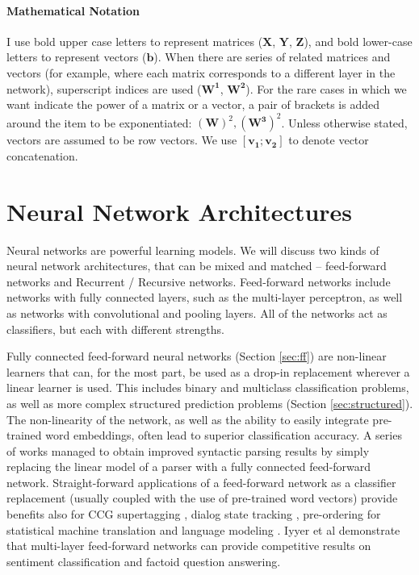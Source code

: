 \documentclass[jair,twoside,11pt,theapa]{article}
\newcommand{\m}[1]{\mathbf{#1}}%
\renewcommand{\shortcite}[0]{\citeyear}
\begin{document}
\paragraph{Mathematical Notation} I use bold upper case letters to represent
matrices ($\m{X}$, $\m{Y}$, $\m{Z}$), and bold lower-case letters to 
represent vectors ($\m{b}$). When there
are series of related matrices and vectors (for example, where each matrix
corresponds to a different layer in the network), superscript indices are used
($\m{W^1}$, $\m{W^2}$). For the rare cases in which we want indicate the power of a
matrix or a vector, a pair of brackets is added around the item to be
exponentiated: $(\m{W})^2, (\m{W^3})^2$. 
Unless otherwise stated, vectors are assumed to be row vectors.
We use $[\m{v_1};\m{v_2}]$ to denote vector concatenation.

\clearpage
\section{Neural Network Architectures}

Neural networks are powerful learning models.
We will discuss two kinds of neural network architectures, that can be mixed and
matched -- feed-forward networks and Recurrent / Recursive networks. 
Feed-forward networks include networks with fully connected layers, such as the
multi-layer perceptron, as well as networks with convolutional and pooling
layers. All of the networks act as classifiers, but each with different
strengths.

Fully connected feed-forward neural networks (Section \ref{sec:ff}) are non-linear learners that
can, for the most part, be used as a drop-in replacement wherever a linear
learner is used. This includes binary and multiclass classification problems,
as well as more complex structured prediction problems (Section
\ref{sec:structured}). The non-linearity of the
network, as well as the ability to easily integrate pre-trained word embeddings,
often lead to superior classification accuracy.  A series of works
\cite{chen2014fast,weiss2015structured,pei2015effective,durrett2015neural} managed to obtain improved syntactic parsing
results by simply replacing the linear model of a parser with a fully connected 
feed-forward network.  Straight-forward applications of a feed-forward network as a
classifier replacement (usually coupled with the use of pre-trained word
vectors) provide
benefits also for CCG supertagging \cite{lewis2014improved}, dialog state tracking \cite{henderson2013deep}, pre-ordering
for statistical machine translation \cite{degispert2015fast} and language
modeling \cite{bengio2003neural,vaswani2013decoding}.  Iyyer et al
\shortcite{iyyer2015deep} demonstrate that multi-layer feed-forward networks can
provide competitive results on sentiment classification and factoid question
answering.
\end{document}
